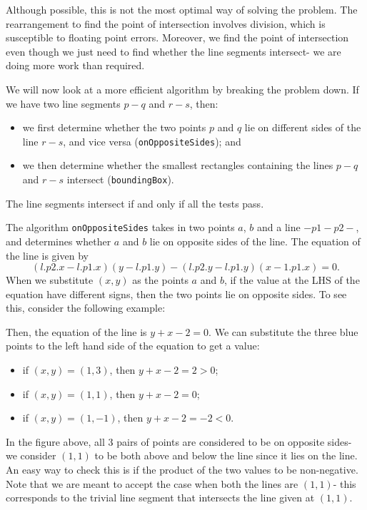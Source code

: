 \documentclass[a4paper, openany]{memoir}
\begin{document}
Although possible, this is not the most optimal way of solving the problem. The rearrangement to find the point of intersection involves division, which is susceptible to floating point errors. Moreover, we find the point of intersection even though we just need to find whether the line segments intersect- we are doing more work than required.

We will now look at a more efficient algorithm by breaking the problem down. If we have two line segments $p-q$ and $r-s$, then:
\begin{itemize}
    \item we first determine whether the two points $p$ and $q$ lie on different sides of the line $r-s$, and vice versa (\texttt{onOppositeSides}); and
    \item we then determine whether the smallest rectangles containing the lines $p-q$ and $r-s$ intersect (\texttt{boundingBox}).
\end{itemize}
The line segments intersect if and only if all the tests pass.

The algorithm \texttt{onOppositeSides} takes in two points $a$, $b$ and a line $-p1-p2-$, and determines whether $a$ and $b$ lie on opposite sides of the line. The equation of the line is given by
\[(l.p2.x - l.p1.x) (y - l.p1.y) - (l.p2.y - l.p1.y) (x - 1.p1.x) = 0.\]
When we substitute $(x, y)$ as the points $a$ and $b$, if the value at the LHS of the equation have different signs, then the two points lie on opposite sides. To see this, consider the following example:
\begin{figure}[H]
    \centering
\end{figure}
\noindent Then, the equation of the line is $y + x - 2 = 0$. We can substitute the three blue points to the left hand side of the equation to get a value:
\begin{itemize}
    \item if $(x, y) = (1, 3)$, then $y + x - 2 = 2 > 0$;
    \item if $(x, y) = (1, 1)$, then $y + x - 2 = 0$;
    \item if $(x, y) = (1, -1)$, then $y + x - 2 = -2 < 0$.
\end{itemize}
In the figure above, all 3 pairs of points are considered to be on opposite sides- we consider $(1, 1)$ to be both above and below the line since it lies on the line. An easy way to check this is if the product of the two values to be non-negative. Note that we are meant to accept the case when both the lines are $(1, 1)$- this corresponds to the trivial line segment that intersects the line given at $(1, 1)$.
\end{document}
